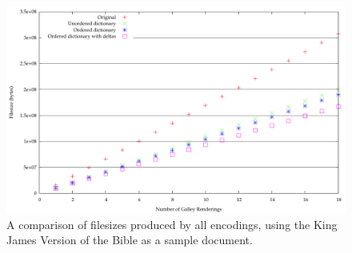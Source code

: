 \newpage



\begin{figure}
  \begin{center}
  \includegraphics[height=\textwidth,angle=90]{gnuplot/kjv-b}
  \end{center}
  \caption[Comparison of filesizes from all encodings]{A comparison of filesizes produced by all encodings, using the King James Version of the Bible as a sample document.}
  \label{fig:size-all-b}
\end{figure}


